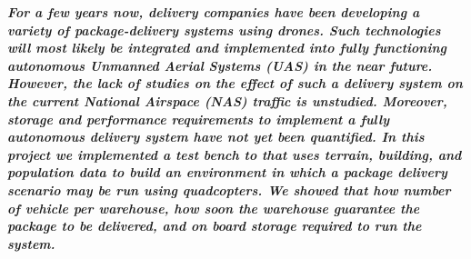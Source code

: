 \textbf{\textit{For a few years now, delivery companies have been developing a variety of package-delivery systems using drones. Such technologies will most likely be integrated and implemented into fully functioning autonomous Unmanned Aerial Systems (UAS) in the near future. However, the lack of studies on the effect of such a delivery system on the current National Airspace (NAS) traffic is unstudied.  Moreover, storage and performance requirements to implement a fully autonomous delivery system have not yet been quantified. In this project we implemented a test bench to that uses terrain, building, and population data to build an environment in which a package delivery scenario may be run using quadcopters. We showed that how number of vehicle per warehouse, how soon the warehouse guarantee the package to be delivered, and on board storage required to run the system.} }

